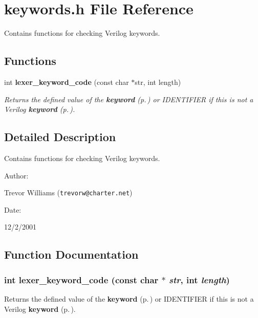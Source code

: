 \section{keywords.h File Reference}
\label{keywords_8h}
Contains functions for checking Verilog keywords. 


\subsection*{Functions}
\begin{CompactItemize}
\item 
int {\bf lexer\_\-keyword\_\-code} (const char $\ast$str, int length)
\begin{CompactList}\small\item\em Returns the defined value of the {\bf keyword} {\rm (p.\,\pageref{structkeyword})} or IDENTIFIER if this is not a Verilog {\bf keyword} {\rm (p.\,\pageref{structkeyword})}.\item\end{CompactList}\end{CompactItemize}


\subsection{Detailed Description}
Contains functions for checking Verilog keywords.



\begin{Desc}
\item[Author: ]\par
Trevor Williams ({\tt trevorw@charter.net}) \end{Desc}
\begin{Desc}
\item[Date: ]\par
12/2/2001\end{Desc}


\subsection{Function Documentation}
\subsubsection{\setlength{\rightskip}{0pt plus 5cm}int lexer\_\-keyword\_\-code (const char $\ast$ {\em str}, int {\em length})}\label{keywords_8h_a0}


Returns the defined value of the {\bf keyword} {\rm (p.\,\pageref{structkeyword})} or IDENTIFIER if this is not a Verilog {\bf keyword} {\rm (p.\,\pageref{structkeyword})}.

